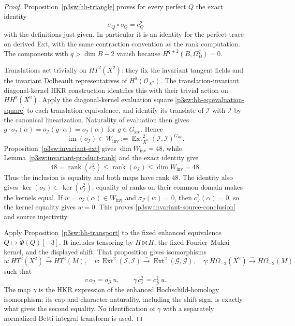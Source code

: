 \documentclass[11pt]{article}
\numberwithin{equation}{section}
\begin{document}
\begin{proof}
Proposition~\ref{p3sw:hh-triangle} proves for every perfect \(Q\)
the exact identity
\[
 \sigma_Q\circ o_Q=c_Q^2
\]
with the definitions just given.  In particular it is an identity for
the perfect trace on derived Ext, with the same contraction convention
as the rank computation.  The components with \(q>\dim B-2\) vanish
because \(H^{q+2}(B,\Omega_B^q)=0\).

Translations act trivially on \(HT^2(X^2)\): they fix the invariant
tangent fields and the invariant Dolbeault representatives of
\(H^a(\mathcal O_{X^2})\).  The translation-invariant diagonal-kernel
HKR construction identifies this with their trivial action on
\(HH^2(X^2)\).  Apply the diagonal-kernel evaluation square
\eqref{p3sw:hh-eq:evaluation-square} to each translation equivalence,
and identify its translate of \(\mathcal I\) with \(\mathcal I\) by
the canonical linearization.  Naturality of evaluation then gives
\(g\cdot o_{\mathcal I}(\alpha)=o_{\mathcal I}(g\cdot\alpha)
=o_{\mathcal I}(\alpha)\) for \(g\in G_{\mathrm{src}}\).  Hence
\[
 \operatorname{im}(o_{\mathcal I})
 \subset
 W_{\mathrm{inv}}
 :=\operatorname{Ext}^2_{X^2}(\mathcal I,\mathcal I)^{G_{\mathrm{src}}}.
\]
Proposition~\ref{p3sw:invariant-ext} gives
\(\dim W_{\mathrm{inv}}=48\), while
Lemma~\ref{p3sw:invariant-product-rank} and the exact identity give
\[
 48=\operatorname{rank}(c_{\mathcal I}^2)
 \leq\operatorname{rank}(o_{\mathcal I})
 \leq\dim W_{\mathrm{inv}}=48.
\]
Thus the inclusion is equality and both maps have rank \(48\).
The identity also gives
\(\ker(o_{\mathcal I})\subset\ker(c_{\mathcal I}^2)\); equality of
ranks on their common domain makes the kernels equal.  If
\(w=o_{\mathcal I}(\alpha)\in W_{\mathrm{inv}}\) and
\(\sigma_{\mathcal I}(w)=0\), then \(c_{\mathcal I}^2(\alpha)=0\),
so the kernel equality gives \(w=0\).  This proves
\eqref{p3sw:invariant-source-conclusion} and source injectivity.

Apply Proposition~\ref{p3sw:hh-transport} to the fixed enhanced
equivalence \(Q\mapsto\widetilde\Phi(Q)[-3]\).  It includes tensoring
by \(H\boxtimes H\), the fixed Fourier--Mukai kernel, and the displayed
shift.  That proposition gives isomorphisms
\[
 u:HT^2(X^2)\xrightarrow{\sim}HT^2(M),\quad
 v:\operatorname{Ext}^2(\mathcal I,\mathcal I)
       \xrightarrow{\sim}\operatorname{Ext}^2(\mathcal G,\mathcal G),
 \quad
 \gamma:H\Omega_{-2}(X^2)\xrightarrow{\sim}H\Omega_{-2}(M)
\]
such that
\begin{equation}\label{p3sw:invariant-transport-squares}
 v\,o_{\mathcal I}=o_{\mathcal G}\,u,\qquad
 \gamma\,c_{\mathcal I}^2=c_{\mathcal G}^2\,u.
\end{equation}
The map \(\gamma\) is the HKR expression of the enhanced
Hochschild-homology isomorphism: its cap and character naturality,
including the shift sign, is exactly what gives the second equality.
No identification of \(\gamma\) with a separately normalized Betti integral
transform is used.


\end{proof}
\end{document}
